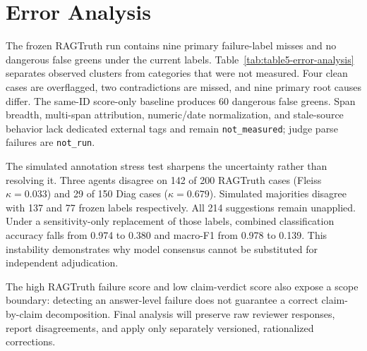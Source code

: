 \section{Error Analysis}
The frozen RAGTruth run contains nine primary failure-label misses and no
dangerous false greens under the current labels. Table~\ref{tab:table5-error-analysis}
separates observed clusters from categories that were not measured. Four clean
cases are overflagged, two contradictions are missed, and nine primary root
causes differ. The same-ID score-only baseline produces 60 dangerous false
greens. Span breadth, multi-span attribution, numeric/date normalization, and
stale-source behavior lack dedicated external tags and remain
\texttt{not\_measured}; judge parse failures are \texttt{not\_run}.

The simulated annotation stress test sharpens the uncertainty rather than
resolving it. Three agents disagree on 142 of 200 RAGTruth cases (Fleiss
$\kappa=0.033$) and 29 of 150 Diag cases ($\kappa=0.679$). Simulated majorities
disagree with 137 and 77 frozen labels respectively. All 214 suggestions remain
unapplied. Under a sensitivity-only replacement of those labels, combined
classification accuracy falls from 0.974 to 0.380 and macro-F1 from 0.978 to
0.139. This instability demonstrates why model consensus cannot be substituted
for independent adjudication.

The high RAGTruth failure score and low claim-verdict score also expose a scope
boundary: detecting an answer-level failure does not guarantee a correct
claim-by-claim decomposition. Final analysis will preserve raw reviewer
responses, report disagreements, and apply only separately versioned,
rationalized corrections.


